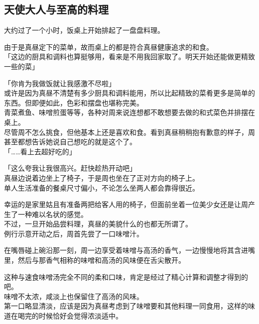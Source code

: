 \subsection{天使大人与至高的料理}

大约过了一个小时，饭桌上开始排起了一盘盘料理。

由于是真昼定下的菜单，故而桌上的都是符合真昼健康追求的和食。\\

「这边的厨具和调料也算挺够用，看来是不用我回家取了。明天开始还能做更精致一些的菜」

「你肯为我做饭就让我感激不尽啦」\\

或许是因为真昼不清楚有多少厨具和调料能用，所以比起精致的菜肴更多是简单的东西。但即便如此，色彩和摆盘也堪称完美。\\

青菜煮鱼、味噌煎蛋等等，各种对周来说连想都不敢想要去做的和式菜色并排摆在桌上。\\

尽管周不怎么挑食，但他基本上还是喜欢和食。看到真昼稍稍抱有歉意的样子，周甚至都想告诉她说自己想吃的就是这个了。\\

「……看上去超好吃的」

「这么夸我让我很高兴。赶快趁热开动吧」\\

真昼边说着边坐上了椅子，于是周也坐在了正对方向的椅子上。\\

单人生活准备的餐桌尺寸偏小，不论怎么坐两人都会靠得很近。

幸运的是家里姑且有准备两把给客人用的椅子，但面前坐着一位美少女还是让周产生了一种难以名状的感觉。\\

不过，一旦开始品尝料理，真昼的美貌什么的也都无所谓了。\\

例行示意开动之后，周首先尝了一口味噌汁。

在嘴唇碰上碗沿那一刻，周一边享受着味噌与高汤的香气，一边慢慢地将其含进嘴里，然后与那香气相称的味噌和高汤的风味便在舌尖散开。

这种与速食味噌汤完全不同的柔和口味，肯定是经过了精心计算和调整才得到的吧。\\

味噌不太浓，咸淡上也保留住了高汤的风味。\\

第一口略显清淡，应该是因为真昼考虑到了味噌要和其他料理一同食用，这样的味道在喝完的时候恰好会觉得浓淡适中。\\

